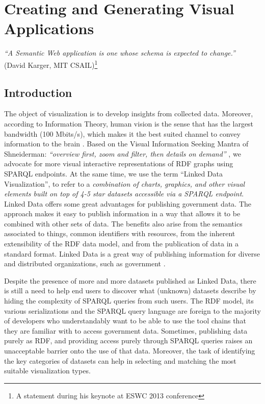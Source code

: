 \chapter{Creating and Generating Visual Applications}
\label{ch:ch5}

\begin{flushright}
\textit{``A Semantic Web application is one whose schema is expected to change.''} \\ (David Karger, MIT CSAIL)\footnote{A statement during his keynote at ESWC 2013 conference}
\end{flushright}


\section*{Introduction}
\label{sec:introch5}
The object of visualization is to develop insights from collected data. Moreover, according to Information Theory, human vision is the sense that has the largest bandwidth (100 Mbits/s), which makes it the best suited channel to convey information to the brain \cite{Ware:2014}. Based on the Visual Information Seeking Mantra of Shneiderman: \textit{``overview first, zoom and filter, then details on demand''} \cite{Shneiderman99}, we advocate for more visual interactive representations of RDF graphs using SPARQL endpoints.   At the same time,  we use the term ``Linked Data Visualization'', to refer to a \textit{combination of charts, graphics, and other visual elements built on top of 4-5 star datasets accessible via a SPARQL endpoint}.
Linked Data offers some great advantages for publishing government data. The approach makes it easy to publish information in a way that allows it to be combined with other sets of data. The benefits also arise from the semantics associated to things, common identifiers with resources, from the inherent extensibility of the RDF data model, and from the publication of data in a standard format. Linked Data is a great way of publishing information for diverse and distributed organizations, such as government \cite{tennison10}.

Despite the presence of more and more datasets published as Linked Data, there is still a need to help end users to discover what (unknown) datasets describe by hiding the complexity of SPARQL queries from such users. The RDF model, its various serializations and the SPARQL query language are foreign to the majority of developers who understandably want to be able to use the tool chains that they are familiar with to access government data. Sometimes, publishing data purely as RDF, and providing access purely through SPARQL queries raises an unacceptable barrier onto the use of that data. Moreover, the task of identifying the key categories of datasets can help in selecting and matching the most suitable visualization types.

